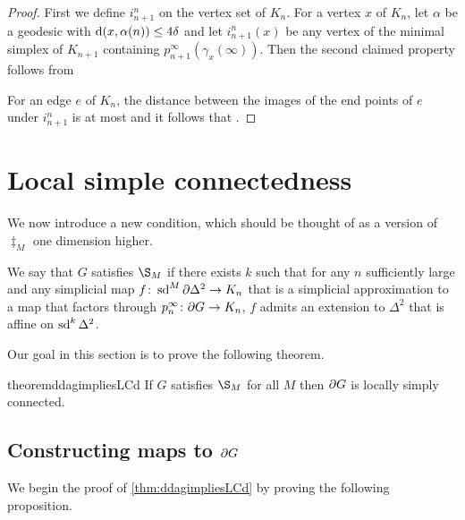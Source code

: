 \documentclass[a4paper]{article}
\begin{document}
\begin{proof}
  First we define $i^n_{n+1}$ on the vertex set of $K_n$. For a vertex $x$ of
  $K_n$, let $\alpha$ be a geodesic with $\operatorname{d}(x, \alpha(n)) \leq 4\delta$ and
  let $i^n_{n+1}(x)$ be any vertex of the minimal simplex of $K_{n+1}$
  containing $p^\infty_{n+1}(\gamma_x(\infty))$. Then the second claimed
  property follows from 

  For an edge $e$ of $K_n$, the distance between the images of the end points
  of $e$ under $i^n_{n+1}$ is at most  and it follows that .
\end{proof}

\section{Local simple connectedness}

\begin{proposition}\label{prop:extendingaffinemaps2}
\end{proposition}

We now introduce a new condition, which should be thought of as a version of
$\ddag_M$ one dimension higher.

\begin{definition}
  We say that $G$ satisfies $\S_M$ if there exists $k$ such that for any $n$
  sufficiently large and any simplicial map $f\colon \operatorname{sd}^M\partial\Delta^2 \to
  K_n$ that is a simplicial approximation to a map that factors through
  $p^\infty_n \colon \partial G \to K_n$, $f$ admits an extension to $\Delta^2$
  that is affine on $\operatorname{sd}^k \Delta^2$.
\end{definition}

Our goal in this section is to prove the following theorem.

\begin{restatable}{theorem}{ddagimpliesLCd}\label{thm:ddagimpliesLCd}
  If $G$ satisfies $\S_M$ for all $M$ then $\partial G$ is locally simply
  connected.
\end{restatable}

\subsection{Constructing maps to $\partial G$}

We begin the proof of \cref{thm:ddagimpliesLCd} by proving the following 
proposition.
\end{document}
